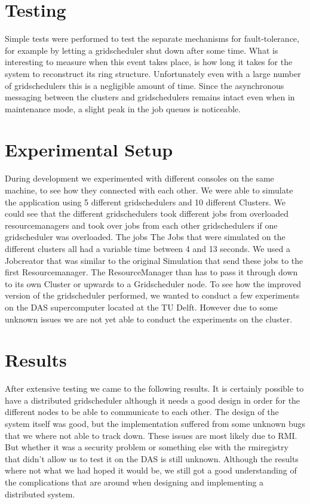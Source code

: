\documentclass[twocolumn,a4paper]{article}
\begin{document}
\section{Testing}
Simple tests were performed to test the separate mechanisms for fault-tolerance, for example by letting a gridscheduler shut down after some time. What is interesting to measure when this event takes place, is how long it takes for the system to reconstruct its ring structure. Unfortunately even with a large number of gridschedulers this is a negligible amount of time. Since the asynchronous messaging between the clusters and gridschedulers remains intact even when in maintenance mode, a slight peak in the job queues is noticeable.

\section{Experimental Setup}
During development we experimented with different consoles on the same machine, to see how they connected with each other. We were able to simulate the application using 5 different gridschedulers and 10 different Clusters. We could see that the different gridschedulers took different jobs from overloaded resourcemanagers and took over jobs from each other gridschedulers if one gridscheduler was overloaded. The jobs The Jobs that were simulated on the different clusters all had a variable time between 4 and 13 seconds. We used a Jobcreator that was similar to the original Simulation that send these jobs to the first Resourcemanager. The ResourceManager than has to pass it through down to its own Cluster or upwards to a Gridscheduler node. 
To see how the improved version of the gridscheduler performed, we wanted to conduct a few experiments on the DAS supercomputer located at the TU Delft. However due to some unknown issues we are not yet able to conduct the experiments on the cluster. 

\section{Results}
After extensive testing we came to the following results. It is certainly possible to have a distributed gridscheduler although it needs a good design in order for the different nodes to be able to communicate to each other. The design of the system itself was good, but the implementation suffered from some unknown bugs that we where not able to track down. These issues are most likely due to RMI. But whether it was a security problem or something else with the rmiregistry that didn't allow us to test it on the DAS is still unknown. Although the results where not what we had hoped it would be, we still got a good understanding of the complications that are around when designing and implementing a distributed system.
\end{document}
